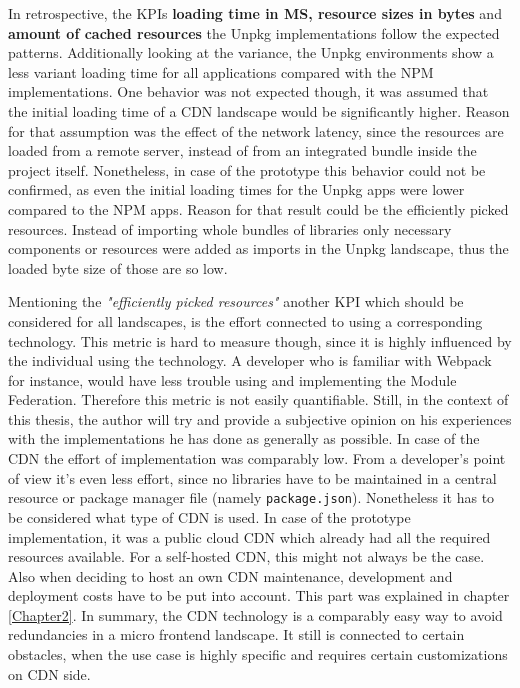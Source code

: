 In retrospective, the KPIs \textbf{loading time in MS, resource sizes in bytes} and \textbf{amount of cached resources} the Unpkg implementations follow the expected patterns. Additionally looking at the variance, the Unpkg environments show a less variant loading time for all applications compared with the NPM implementations. 
One behavior was not expected though, it was assumed that the initial loading time of a CDN landscape would be significantly higher. Reason for that assumption was the effect of the network latency, since the resources are loaded from a remote server, instead of from an integrated bundle inside the project itself. Nonetheless, in case of the prototype this behavior could not be confirmed, as even the initial loading times for the Unpkg apps were lower compared to the NPM apps. Reason for that result could be the efficiently picked resources. Instead of importing whole bundles of libraries only necessary components or resources were added as imports in the Unpkg landscape, thus the loaded byte size of those are so low.

Mentioning the \textit{"efficiently picked resources"} another KPI which should be considered for all landscapes, is the effort connected to using a corresponding technology. This metric is hard to measure though, since it is highly influenced by the individual using the technology. A developer who is familiar with Webpack for instance, would have less trouble using and implementing the Module Federation. Therefore this metric is not easily quantifiable. Still, in the context of this thesis, the author will try and provide a subjective opinion on his experiences with the implementations he has done as generally as possible. 
In case of the CDN the effort of implementation was comparably low. From a developer's point of view it's even less effort, since no libraries have to be maintained in a central resource or package manager file (namely \texttt{package.json}). Nonetheless it has to be considered what type of CDN is used.
In case of the prototype implementation, it was a public cloud CDN which already had all the required resources available. For a self-hosted CDN, this might not always be the case. Also when deciding to host an own CDN maintenance, development and deployment costs have to be put into account. This part was explained in chapter \ref{Chapter2}.
In summary, the CDN technology is a comparably easy way to avoid redundancies in a micro frontend landscape. It still is connected to certain obstacles, when the use case is highly specific and requires certain customizations on CDN side. 


